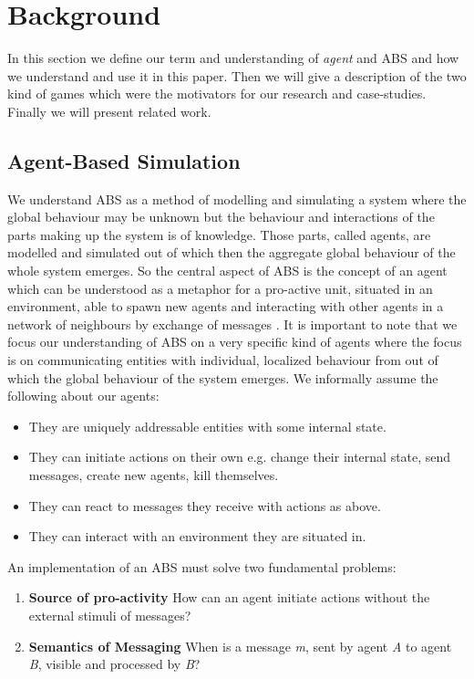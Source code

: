 \section{Background}
In this section we define our term and understanding of \textit{agent} and ABS and how we understand and use it in this paper. Then we will give a description of the two kind of games which were the motivators for our research and case-studies. Finally we will present related work.

\subsection{Agent-Based Simulation}
We understand ABS as a method of modelling and simulating a system where the global behaviour may be unknown but the behaviour and interactions of the parts making up the system is of knowledge. Those parts, called agents, are modelled and simulated out of which then the aggregate global behaviour of the whole system emerges. So the central aspect of ABS is the concept of an agent which can be understood as a metaphor for a pro-active unit, situated in an environment, able to spawn new agents and interacting with other agents in a network of neighbours by exchange of messages \cite{wooldridge_introduction_2009}. It is important to note that we focus our understanding of ABS on a very specific kind of agents where the focus is on communicating entities with individual, localized behaviour from out of which the global behaviour of the system emerges. We informally assume the following about our agents:

\begin{itemize}
	\item They are uniquely addressable entities with some internal state.
	\item They can initiate actions on their own e.g. change their internal state, send messages, create new agents, kill themselves.
	\item They can react to messages they receive with actions as above.
	\item They can interact with an environment they are situated in.
\end{itemize} 

An implementation of an ABS must solve two fundamental problems:

\begin{enumerate}
	\item \textbf{Source of pro-activity} How can an agent initiate actions without the external stimuli of messages?
	\item \textbf{Semantics of Messaging} When is a message \textit{m}, sent by agent \textit{A} to agent \textit{B}, visible and processed by \textit{B}?
\end{enumerate}

